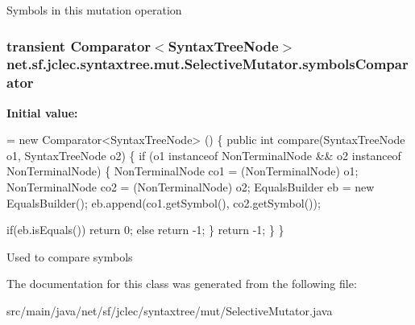 Symbols in this mutation operation \hypertarget{classnet_1_1sf_1_1jclec_1_1syntaxtree_1_1mut_1_1_selective_mutator_a1ec0754396acce41f549a70a6b7ac88c}{
\subsubsection[{symbols\-Comparator}]{\setlength{\rightskip}{0pt plus 5cm}transient Comparator$<${\bf Syntax\-Tree\-Node}$>$ net.\-sf.\-jclec.\-syntaxtree.\-mut.\-Selective\-Mutator.\-symbols\-Comparator\hspace{0.3cm}{\ttfamily [protected]}}}\label{classnet_1_1sf_1_1jclec_1_1syntaxtree_1_1mut_1_1_selective_mutator_a1ec0754396acce41f549a70a6b7ac88c}
{\bfseries Initial value\-:}
\begin{DoxyCode}
= \textcolor{keyword}{new} Comparator<SyntaxTreeNode> () 
    \{
        \textcolor{keyword}{public} \textcolor{keywordtype}{int} compare(SyntaxTreeNode o1, SyntaxTreeNode o2) 
        \{           
            \textcolor{keywordflow}{if} (o1 instanceof NonTerminalNode && o2 instanceof NonTerminalNode) \{
                NonTerminalNode co1 = (NonTerminalNode) o1;
                NonTerminalNode co2 = (NonTerminalNode) o2;
                EqualsBuilder eb = \textcolor{keyword}{new} EqualsBuilder();
                eb.append(co1.getSymbol(), co2.getSymbol());
                
                \textcolor{keywordflow}{if}(eb.isEquals())
                    \textcolor{keywordflow}{return} 0;
                \textcolor{keywordflow}{else}
                    \textcolor{keywordflow}{return} -1;
            \}
            \textcolor{keywordflow}{return} -1;
        \}   
    \}
\end{DoxyCode}
Used to compare symbols 

The documentation for this class was generated from the following file\-:\begin{DoxyCompactItemize}
\item 
src/main/java/net/sf/jclec/syntaxtree/mut/Selective\-Mutator.\-java\end{DoxyCompactItemize}
